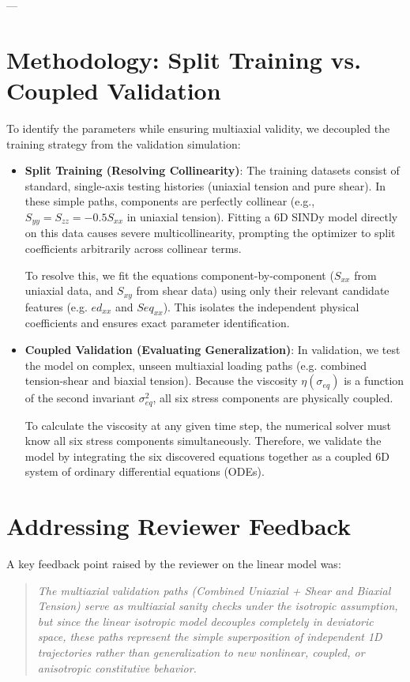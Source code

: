 \documentclass{article}
\begin{document}
---

\section{Methodology: Split Training vs. Coupled Validation}
To identify the parameters while ensuring multiaxial validity, we decoupled the training strategy from the validation simulation:

\begin{itemize}
    \item \textbf{Split Training (Resolving Collinearity)}: 
    The training datasets consist of standard, single-axis testing histories (uniaxial tension and pure shear). In these simple paths, components are perfectly collinear (e.g., $S_{yy} = S_{zz} = -0.5 S_{xx}$ in uniaxial tension). Fitting a 6D SINDy model directly on this data causes severe multicollinearity, prompting the optimizer to split coefficients arbitrarily across collinear terms. 
    
    To resolve this, we fit the equations component-by-component ($S_{xx}$ from uniaxial data, and $S_{xy}$ from shear data) using only their relevant candidate features (e.g. $ed_{xx}$ and $Seq_{xx}$). This isolates the independent physical coefficients and ensures exact parameter identification.
    
    \item \textbf{Coupled Validation (Evaluating Generalization)}: 
    In validation, we test the model on complex, unseen multiaxial loading paths (e.g. combined tension-shear and biaxial tension). Because the viscosity $\eta(\sigma_{eq})$ is a function of the second invariant $\sigma_{eq}^2$, all six stress components are physically coupled. 
    
    To calculate the viscosity at any given time step, the numerical solver must know all six stress components simultaneously. Therefore, we validate the model by integrating the six discovered equations together as a coupled 6D system of ordinary differential equations (ODEs).
\end{itemize}

\section{Addressing Reviewer Feedback}
A key feedback point raised by the reviewer on the linear model was:
\begin{quote}
    \textit{The multiaxial validation paths (Combined Uniaxial + Shear and Biaxial Tension) serve as multiaxial sanity checks under the isotropic assumption, but since the linear isotropic model decouples completely in deviatoric space, these paths represent the simple superposition of independent 1D trajectories rather than generalization to new nonlinear, coupled, or anisotropic constitutive behavior.}
\end{quote}
\end{document}
